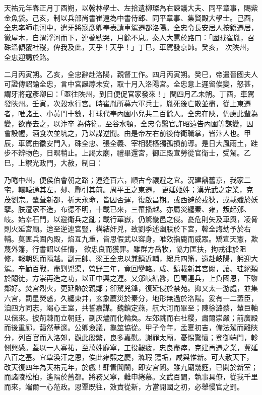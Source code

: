 \begin{pinyinscope}
 天祐元年春正月丁酉朔，以翰林學士、左拾遺柳璨為右諫議大夫、同平章事，賜紫金魚袋。己亥，制以兵部尚書崔遠為中書侍郎、同平章事、集賢殿大學士。己酉，全忠率師屯河中，遣牙將寇彥卿奉表請車駕遷都洛陽。全忠令長安居人按籍遷居，徹屋木，自渭浮河而下，連甍號哭，月餘不息。秦人大罵於路曰：「國賊崔胤，召硃溫傾覆社稷，俾我及此，天乎！天乎！」丁巳，車駕發京師。癸亥，
 次陜州，全忠迎謁於路。



 二月丙寅朔。乙亥，全忠辭赴洛陽，親督工作。四月丙寅朔。癸巳，帝遣晉國夫人可證傳詔諭全忠，言中宮誕蓐未安，取十月入洛陽宮。全忠意上遲留俟變，怒甚，謂牙將寇彥卿曰：「亟往陜州，到日便促官家發來！」閏四月乙未朔。丁酉，車駕發陜州。壬寅，次穀水行宮。時崔胤所募六軍兵士，胤死後亡散並盡，從上東遷者，唯諸王、小黃門十數，打球代奉內園小兒共二百餘人。全忠在陜，仍慮此輩為變，欲盡去之，以汴卒
 為侍衛。至谷水頓，全忠令醫官許昭遠告內園等謀變，因會設幄，酒食次並坑之，乃以謀逆聞。由是帝左右前後侍衛職掌，皆汴人也。甲辰，車駕由徽安門入，硃全忠、張全義、宰相裴樞獨孤損前導。是日大風雨土，跬步不辨物色，日暝稍止。上謁太廟，禮畢還宮，御正殿宣勞從官衛士，受駕。乙巳，上禦光政門，大赦，制曰：



 乃睠中州，便侯伯會朝之路；運逢百六，順古今禳避之宜。況建鼎舊京，我家二宅，轘轅通其左，郟、鄏引其前。周平王之東遷，
 更延姬姓；漢光武之定業，克茂劉宗。肇葺新都，祈天永命，皆因否運，復啟昌期。或西避於戎狄，或載殲於妖孽。朕遭家不造，布德不明，十載已來，三罹播越。亦屬災纏秦、雍，叛起邠、岐。始幸石門，以避衛兵之亂；載行華嶽，仍驚畿邑之侵。憂危則矢及車輿，凌脅則火延宮廟。迨至逆連宮豎，構結奸兇，致劉季述幽朕於下宮，韓全誨劫予於右輔。莫匪兵圍內殿，焰亙九重，皆思假武以容身，唯效指鹿而威眾。矯宣天憲，欺蔑外籓，行書詔以任情，
 欲忠良而獲罪。雖群方岳牧，協力匡扶，拘戎律於阻修，報朝恩而隔越。副元帥、梁王全忠以兼鎮近輔，總兵四籓，遠赴岐陽，躬迎大駕。辛勤百戰，盡剿兇渠，營野三年，竟回鑾輅。咸、鎬載新其宮闕，讓、珪絕類於閹徒，方崇再造之功，以正中興之運。又邠岐結釁，巴蜀連兵，上負國恩，下隳鄰好。焚宮烈火，更延熱於親鄰；卻駕兇鋒，復延侵於禁苑。抑又太一游處，並集六宮，罰星熒惑，久纏東井，玄象薦災於秦分，地形無過於洛陽。爰有一二藎臣，
 洎四方同志，竭心王室，共誓嘉謀。魏鎮定燕，航大河而畢至；陳徐潞蔡，輦巨軸以偕來。披荊棘而立朝廷，劃灰燼而化輪奐。左郊祧而右社稷，肅爾崇嚴；前廣殿而後重廊，藹然華邃。公卿僉議，龜筮協從。甲子令年，孟夏初吉，備法駕而離陜分，列百官而入洛郊，觀此殷繁，良多嘉慰。謝罪太廟，憂惕驚懷；登御端門，軫惻興感。蓋以一人寡祐，至萬姓靡寧，工役艱疲，忠良盡瘁，克建再遷之業，冀延八百之基。宜覃渙汗之恩，俟此雍熙之慶，滌瑕
 蕩垢，咸與惟新。可大赦天下，改天復四年為天祐元年，於戲！肆眚閶闔，即安宮闈。雖九廟幾筵，已閟於新室；而諸陵松柏，遙隔於舊都。將務乂寧，難申綣慕。文武百闢，執事具僚，從我千里而來，端爾一心蒞政。恩覃既往，效責從新，方當開國之初，必舉慢官之罰。




\end{pinyinscope}
